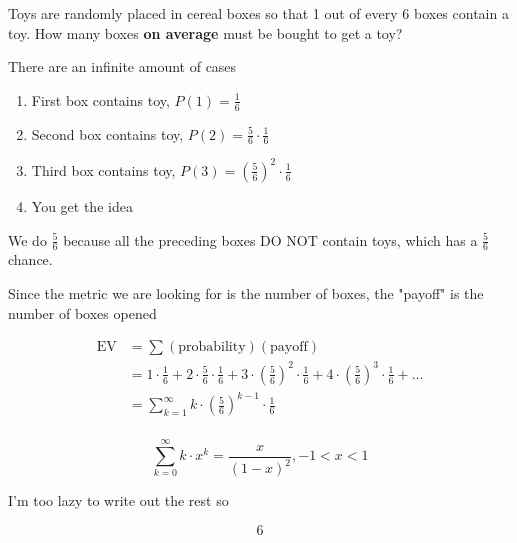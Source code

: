 \documentclass[../../Main.tex]{subfiles}
\begin{document}
\begin{example}
    Toys are randomly placed in cereal boxes so that 1 out of every 6 boxes contain a toy. How many boxes \textbf{on average} must be bought to get a toy?

    There are an infinite amount of cases

    \begin{enumerate}
        \item First box contains toy, $P(1) = \frac{1}{6}$
        \item Second box contains toy, $P(2) = \frac{5}{6} \cdot \frac{1}{6}$
        \item Third box contains toy, $P(3) = \left(\frac{5}{6}\right)^2 \cdot \frac{1}{6}$
        \item You get the idea
    \end{enumerate}

    We do $\frac{5}{6}$ because all the preceding boxes DO NOT contain toys, which has a $\frac{5}{6}$ chance.

    Since the metric we are looking for is the number of boxes, the "payoff" is the number of boxes opened

    \begin{align*}
        \text{EV} &= \sum (\text{probability})(\text{payoff}) \\
        &= 
        1 \cdot \frac{1}{6} + 
        2 \cdot \frac{5}{6} \cdot \frac{1}{6} + 
        3 \cdot \left(\frac{5}{6}\right)^2 \cdot \frac{1}{6} + 
        4 \cdot \left(\frac{5}{6}\right)^3 \cdot \frac{1}{6} + \ldots \\
        &= \sum_{k = 1}^{\infty} k \cdot \left(\frac{5}{6}\right)^{k - 1} \cdot \frac{1}{6} \\
    \end{align*}

    \begin{recall}
        $$\sum_{k = 0}^{\infty} k\cdot x^k = \frac{x}{(1 - x)^2}, -1 < x < 1$$
    \end{recall}

    I'm too lazy to write out the rest so

    $$\boxed{6}$$

\end{example}

\end{document}
